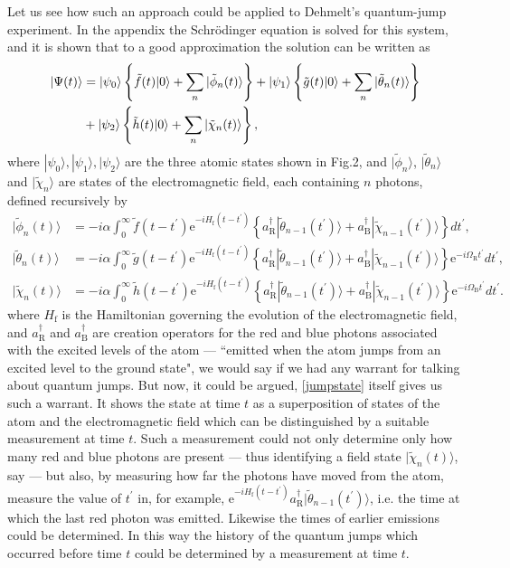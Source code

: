 \documentclass[12pt,a4paper,reqno]{article}
\renewcommand{\(}{\left(}
\renewcommand{\)}{\right)}
\newcommand{\pr}{^\prime}
\newcommand{\e}{\mbox{e}}
\newcommand{\tR}{\text{R}}
\newcommand{\tB}{\text{B}}
\newcommand{\tf}{\text{f}}
\newcommand{\<}{\langle}
\renewcommand{\>}{\rangle}
\theoremstyle{plain} %
\theoremstyle{definition}
\theoremstyle{remark}
\begin{document}
Let us see how such an approach could be applied to Dehmelt's
quantum-jump experiment. In the appendix the Schr\"odinger equation is
solved for this system, and it is shown that to a good approximation the
solution can be written as  
\begin{align}
|\Psi(t)\> &= |\psi_0\>\left\{\tilde{f}(t)|0\> +
\sum_n|\tilde{\phi}_n(t)\>\right\} +  |\psi_1\>\left\{\tilde{g}(t)|0\> +
\sum_n|\tilde{\theta}_n(t)\>\right\}\notag\\
&+|\psi_2\>\left\{\tilde{h}(t)|0\> + \sum_n|\tilde{\chi}_n(t)\>\right\},
\label{jumpstate}
\end{align} 
where $|\psi_0\>,|\psi_1\>,|\psi_2\>$ are
the three atomic states shown in Fig.2, and $|\tilde{\phi}_n\>$,
$|\tilde{\theta}_n\>$ and $|\tilde{\chi}_n\>$ are states of the
electromagnetic field, each containing $n$ photons, defined recursively
by 
\begin{equation}\label{fieldstates} 
\begin{aligned}
|\tilde{\phi}_n(t)\> &=
-i\alpha\int_0^\infty\tilde{f}(t-t\pr)\e^{-iH_{\tf}(t-t\pr)}
\left\{a_{\tR}^\dagger|\tilde{\theta}_{n-1}(t\pr)\> +
a_{\tB}^\dagger|\tilde{\chi}_{n-1}(t\pr)\>\right\}dt\pr,\\
|\tilde{\theta}_n(t)\> &=
-i\alpha\int_0^\infty\tilde{g}(t-t\pr)\e^{-iH_{\tf}(t-t\pr)}
\left\{a_{\tR}^\dagger|\tilde{\theta}_{n-1}(t\pr)\> +
a_{\tB}^\dagger|\tilde{\chi}_{n-1}(t\pr)\>\right\}\e^{-i\Omega_{\tR}t\pr}dt\pr,\\
|\tilde{\chi}_n(t)\> &=
-i\alpha\int_0^\infty\tilde{h}(t-t\pr)\e^{-iH_{\tf}(t-t\pr)}
\left\{a_{\tR}^\dagger|\tilde{\theta}_{n-1}(t\pr)\> +
a_{\tB}^\dagger|\tilde{\chi}_{n-1}(t\pr)\>\right\}\e^{-i\Omega_{\tB}t\pr}dt\pr.
\end{aligned} 
\end{equation} 
where $H_{\tf}$ is the Hamiltonian
governing the evolution of the electromagnetic field, and
$a_{\tR}^\dagger$ and $a_{\tB}^\dagger$  are creation operators for the
red and blue photons associated with the excited levels of the atom ---
``emitted when the atom jumps from an excited level to the ground
state", we would say if we had any warrant for talking about quantum
jumps. But now, it could be argued, \eqref{jumpstate} itself gives us
such a warrant. It shows the state at time $t$ as a superposition of
states of the atom and the electromagnetic field which can be distinguished by a
suitable measurement at time $t$. Such a measurement could not only determine
only how many red and blue photons are present --- thus identifying a
field state $|\tilde{\chi}_n(t)\>$, say --- but also, by
measuring how far the photons have moved from the atom, measure the
value of $t\pr$ in, for example, $\e^{-iH_{\tf}(t-t\pr)}
a_{\tR}^\dagger|\tilde{\theta}_{n-1}(t\pr)\>$, i.e. the time at
which the last red photon was emitted. Likewise the times of earlier
emissions could be determined. In this way the history of the quantum
jumps which occurred before time $t$ could be determined by a
measurement at time $t$.
\end{document}
